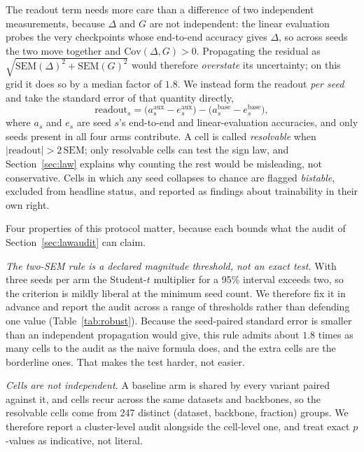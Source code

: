 The readout term needs more care than a difference of two independent
measurements, because $\Delta$ and $G$ are not independent: the linear
evaluation probes the very checkpoints whose end-to-end accuracy gives
$\Delta$, so across seeds the two move together and
$\mathrm{Cov}(\Delta, G) > 0$. Propagating the residual as
$\sqrt{\mathrm{SEM}(\Delta)^2 + \mathrm{SEM}(G)^2}$ would therefore
\emph{overstate} its uncertainty; on this grid it does so by a median
factor of $1.8$. We instead form the readout \emph{per seed} and take the
standard error of that quantity directly,
\begin{equation}
  \mathrm{readout}_s =
  \bigl(a^{\mathrm{aux}}_s - e^{\mathrm{aux}}_s\bigr) -
  \bigl(a^{\mathrm{base}}_s - e^{\mathrm{base}}_s\bigr),
  \label{eq:sem}
\end{equation}
where $a_s$ and $e_s$ are seed $s$'s end-to-end and linear-evaluation
accuracies, and only seeds present in all four arms contribute. A cell is called
\emph{resolvable} when $|\mathrm{readout}| > 2\,\mathrm{SEM}$; only
resolvable cells can test the sign law, and Section~\ref{sec:law}
explains why counting the rest would be misleading, not conservative. Cells in which any seed collapses to chance are flagged
\emph{bistable}, excluded from headline status, and reported as findings
about trainability in their own right.

Four properties of this protocol matter, because each
bounds what the audit of Section~\ref{sec:lawaudit} can claim.

\emph{The two-SEM rule is a declared magnitude threshold, not an exact
test.} With three seeds per arm the Student-$t$ multiplier for a 95\%
interval exceeds two, so the criterion is mildly liberal at the minimum
seed count. We therefore fix it in advance and report the audit across a
range of thresholds rather than defending one value
(Table~\ref{tab:robust}). Because the seed-paired standard error is
smaller than an independent propagation would give, this rule admits about
$1.8$ times as many cells to the audit as the naive formula does, and the
extra cells are the borderline ones. That makes the test harder, not
easier.

\emph{Cells are not independent.} A baseline arm is shared by every
variant paired against it, and cells recur across the same datasets and
backbones, so the \auditResolvable{} resolvable cells come from 247 distinct
(dataset, backbone, fraction) groups. We
therefore report a cluster-level audit alongside the cell-level one, and
treat exact $p$-values as indicative, not literal.

